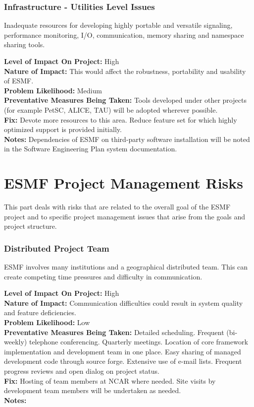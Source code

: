 \documentclass[english]{article}
\newcommand{\req}[1]{\section{\hspace{.2in}#1}}
\newenvironment
{reqlist}
{\begin{list} {} {} \rm \item[]}
{\end{list}}
\begin{document}
\req{Infrastructure - Utilities Level Issues}
Inadequate resources for developing highly portable and versatile
signaling, performance monitoring, I/O, communication, memory sharing and namespace sharing tools.
\begin{reqlist}
{\bf Level of Impact On Project:} High \\
{\bf Nature of Impact:} This would affect the robustness, portability and usability
of ESMF. \\
{\bf Problem Likelihood:} Medium \\
{\bf Preventative Measures Being Taken:} Tools developed under other projects (for example PetSC, ALICE, TAU)
will be adopted wherever possible.
\\
{\bf Fix:} Devote more resources to this area. Reduce feature set for which
highly optimized support is provided initially. \\
{\bf Notes:} Dependencies of ESMF on third-party software installation will be noted
in the Software Engineering Plan system documentation.
\end{reqlist}

\newpage
\part{ESMF Project Management Risks}
This part deals with risks that are related to the overall goal of the ESMF project and
to specific project management issues that arise from the goals and project structure.


\req{Distributed Project Team}
ESMF involves many institutions and a geographical distributed team. 
This can create competing time pressures and difficulty in communication.

\begin{reqlist}
{\bf Level of Impact On Project:} High \\
{\bf Nature of Impact:} Communication difficulties could result in system quality and feature deficiencies. \\
{\bf Problem Likelihood:} Low \\
{\bf Preventative Measures Being Taken:} Detailed scheduling. Frequent (bi-weekly) telephone
conferencing. Quarterly meetings. Location of core framework implementation and development
team in one place. Easy sharing of managed development code through source forge. 
Extensive use of e-mail lists. Frequent progress reviews and open dialog on project status.
\\
{\bf Fix:} Hosting of team members at NCAR where needed.
Site visits by development team members will be undertaken as needed.
\\
{\bf Notes:} 
\end{reqlist}
\end{document}
